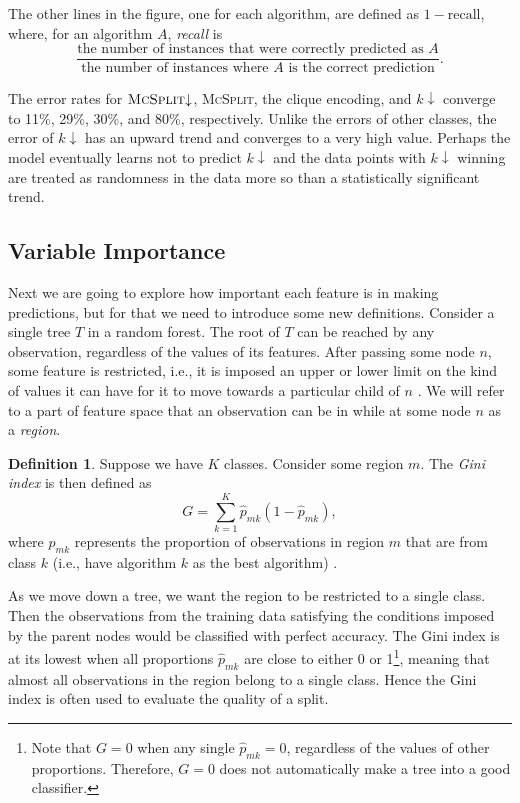 \documentclass{l4proj}
\theoremstyle{definition}
\newtheorem{definition}{Definition}[chapter]
\theoremstyle{remark}
\begin{document}
The other lines in the figure, one for each algorithm, are defined as $1 -
\text{recall}$, where, for an algorithm $A$, \emph{recall}
\cite{citeulike:12882259} is
\[ \frac{\text{the number of instances that were correctly predicted as
      $A$}}{\text{the number of instances where $A$ is the correct
      prediction}}. \]

The error rates for $\textsc{McSplit}{\downarrow}$, \textsc{McSplit}, the clique
encoding, and $k{\downarrow}$ converge to 11\%, 29\%, 30\%, and 80\%,
respectively. Unlike the errors of other classes, the error of $k{\downarrow}$ has
an upward trend and converges to a very high value. Perhaps the model eventually
learns not to predict $k{\downarrow}$ and the data points with $k{\downarrow}$
winning are treated as randomness in the data more so than a statistically
significant trend.

\subsection{Variable Importance}

Next we are going to explore how important each feature is in making
predictions, but for that we need to introduce some new definitions. Consider a
single tree $T$ in a random forest. The root of $T$ can be reached by any
observation, regardless of the values of its features. After passing some node
$n$, some feature is restricted, i.e., it is imposed an upper or lower limit on
the kind of values it can have for it to move towards a particular child of $n$
\cite{James:2014:ISL:2517747}. We will refer to a part of feature space that an
observation can be in while at some node $n$ as a \emph{region}.

\begin{definition}
  Suppose we have $K$ classes. Consider some region $m$. The \emph{Gini index}
  is then defined as
  \[ G = \sum_{k=1}^K \hat{p}_{mk}(1-\hat{p}_{mk}), \]
  where $\hat{p}_{mk}$ represents the proportion of observations in region $m$
  that are from class $k$ (i.e., have algorithm $k$ as the best algorithm)
  \cite{James:2014:ISL:2517747}.
\end{definition}

As we move down a tree, we want the region to be restricted to a single class.
Then the observations from the training data satisfying the conditions imposed
by the parent nodes would be classified with perfect accuracy. The Gini index is
at its lowest when all proportions $\hat{p}_{mk}$ are close to either 0 or
1\footnote{Note that $G=0$ when any single $\hat{p}_{mk}=0$, regardless of the
  values of other proportions. Therefore, $G=0$ does not automatically make a
  tree into a good classifier.}, meaning that almost all observations in the
region belong to a single class. Hence the Gini index is often used to evaluate
the quality of a split.
\end{document}
